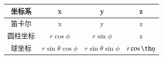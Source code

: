 \documentclass[twocolumn]{ctexart}
\begin{document}
\begin{table}[H]
  \centering
  \begin{tabular}{cccc}
 \\ \hline
  坐标系&x&y&z  \\
   \hline
   笛卡尔&x&y&z \\
   \hline
    圆柱坐标&$r\cos \phi$&$r \sin \phi$&z \\
    \hline
    球坐标&$r\sin \theta\cos \phi$&$r\sin \theta \sin \phi$&$r \cos \th\eta$ \\
    \hline
\end{tabular}
\end{table}
\end{document}
